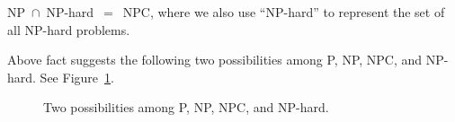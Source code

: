 \begin{fact}
NP{}~$\cap${}~NP-hard{}~$=${}~NPC, where we also use ``NP-hard'' to represent the set of all NP-hard problems.
\end{fact}

Above fact suggests the following two possibilities among P, NP, NPC, and NP-hard. See Figure~\ref{fig:nphard}.

\begin{figure}[!h]
\centering{}
\vspace*{-0.1cm}
\caption{Two possibilities among P, NP, NPC, and NP-hard.}
\label{fig:nphard}
\end{figure}



